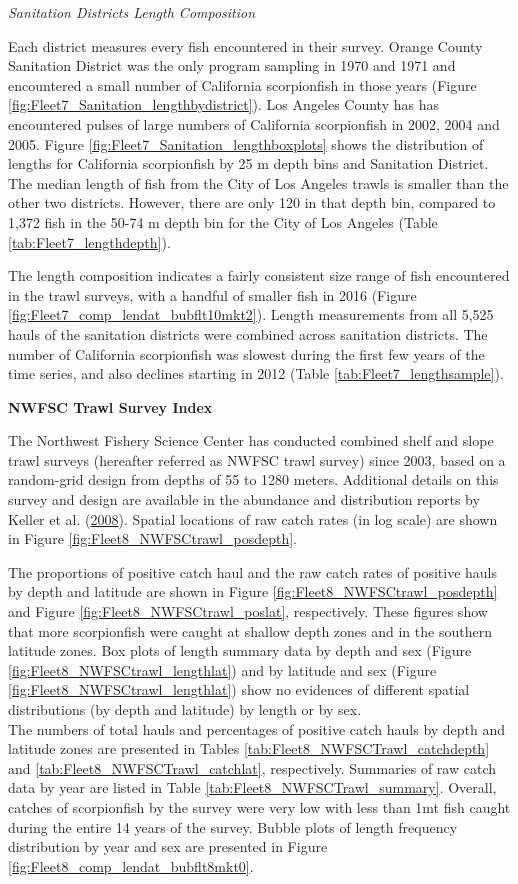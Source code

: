 \documentclass[12pt,]{article}
\begin{document}
\emph{Sanitation Districts Length Composition}

Each district measures every fish encountered in their survey. Orange
County Sanitation District was the only program sampling in 1970 and
1971 and encountered a small number of California scorpionfish in those
years (Figure \ref{fig:Fleet7_Sanitation_lengthbydistrict}). Los Angeles
County has has encountered pulses of large numbers of California
scorpionfish in 2002, 2004 and 2005. Figure
\ref{fig:Fleet7_Sanitation_lengthboxplots} shows the distribution of
lengths for California scorpionfish by 25 m depth bins and Sanitation
District. The median length of fish from the City of Los Angeles trawls
is smaller than the other two districts. However, there are only 120 in
that depth bin, compared to 1,372 fish in the 50-74 m depth bin for the
City of Los Angeles (Table \ref{tab:Fleet7_lengthdepth}).

The length composition indicates a fairly consistent size range of fish
encountered in the trawl surveys, with a handful of smaller fish in 2016
(Figure \ref{fig:Fleet7_comp_lendat_bubflt10mkt2}). Length measurements
from all 5,525 hauls of the sanitation districts were combined across
sanitation districts. The number of California scorpionfish was slowest
during the first few years of the time series, and also declines
starting in 2012 (Table \ref{tab:Fleet7_lengthsample}).

\textbf{NWFSC Trawl Survey Index}

The Northwest Fishery Science Center has conducted combined shelf and
slope trawl surveys (hereafter referred as NWFSC trawl survey) since
2003, based on a random-grid design from depths of 55 to 1280 meters.
Additional details on this survey and design are available in the
abundance and distribution reports by Keller et al.
(\protect\hyperlink{ref-Keller2008}{2008}). Spatial locations of raw
catch rates (in log scale) are shown in Figure
\ref{fig:Fleet8_NWFSCtrawl_posdepth}.

The proportions of positive catch haul and the raw catch rates of
positive hauls by depth and latitude are shown in Figure
\ref{fig:Fleet8_NWFSCtrawl_posdepth} and Figure
\ref{fig:Fleet8_NWFSCtrawl_poslat}, respectively. These figures show
that more scorpionfish were caught at shallow depth zones and in the
southern latitude zones. Box plots of length summary data by depth and
sex (Figure \ref{fig:Fleet8_NWFSCtrawl_lengthlat}) and by latitude and
sex (Figure \ref{fig:Fleet8_NWFSCtrawl_lengthlat}) show no evidences of
different spatial distributions (by depth and latitude) by length or by
sex.\\
The numbers of total hauls and percentages of positive catch hauls by
depth and latitude zones are presented in Tables
\ref{tab:Fleet8_NWFSCTrawl_catchdepth} and
\ref{tab:Fleet8_NWFSCTrawl_catchlat}, respectively. Summaries of raw
catch data by year are listed in Table
\ref{tab:Fleet8_NWFSCTrawl_summary}. Overall, catches of scorpionfish by
the survey were very low with less than 1mt fish caught during the
entire 14 years of the survey. Bubble plots of length frequency
distribution by year and sex are presented in Figure
\ref{fig:Fleet8_comp_lendat_bubflt8mkt0}.
\end{document}
